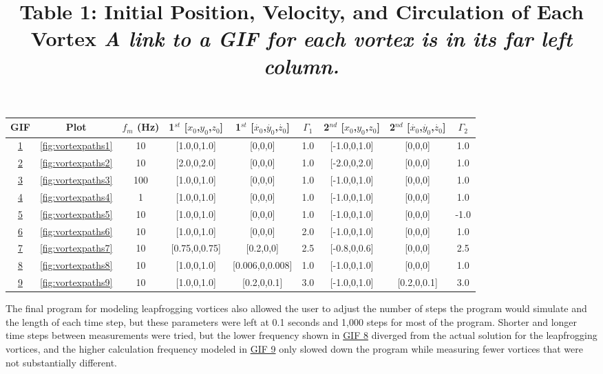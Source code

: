 \documentclass{article}
\begin{document}
\begin{table}
	\centering
	\title{Table 1: Initial Position, Velocity, and Circulation of Each Vortex \newline}
	\title{\emph{A link to a GIF for each vortex is in its far left column.}}
	\begin{tabular}{ | c | c | c | c | c | c | c | c | c |}
		\hline
		GIF & Plot & $f_m$ (Hz) & 1$^{st}$ [$x_0$,$y_0$,$z_0$] & 1$^{st}$ [$\dot{x_0}$,$\dot{y_0}$,$\dot{z_0}$] & $\Gamma_1$ & 2$^{nd}$ [$x_0$,$y_0$,$z_0$] & 2$^{nd}$ [$\dot{x_0}$,$\dot{y_0}$,$\dot{z_0}$] & $\Gamma_2$ \\ \hline
		\href{https://imgur.com/U4cND6X}{1} & \ref{fig:vortexpaths1} & 10 & [1.0,0,1.0] & [0,0,0] & 1.0 & [-1.0,0,1.0] & [0,0,0] & 1.0 \\ \hline
		\href{https://imgur.com/lviamWB}{2} & \ref{fig:vortexpaths2} & 10 & [2.0,0,2.0] & [0,0,0] & 1.0 & [-2.0,0,2.0] & [0,0,0] & 1.0 \\ \hline
		\href{https://imgur.com/6jT1mT0}{3} & \ref{fig:vortexpaths3} & 100 & [1.0,0,1.0] & [0,0,0] & 1.0 & [-1.0,0,1.0] & [0,0,0] & 1.0 \\ \hline
		\href{https://imgur.com/PtazOFB}{4} & \ref{fig:vortexpaths4} & 1 & [1.0,0,1.0] & [0,0,0] & 1.0 & [-1.0,0,1.0] & [0,0,0] & 1.0 \\ \hline	
		\href{https://imgur.com/wSpWEQV}{5} & \ref{fig:vortexpaths5} & 10 & [1.0,0,1.0] & [0,0,0] & 1.0 & [-1.0,0,1.0] & [0,0,0] & -1.0 \\ \hline
		\href{https://imgur.com/aZzMnJV}{6} & \ref{fig:vortexpaths6} & 10 & [1.0,0,1.0] & [0,0,0] & 2.0 & [-1.0,0,1.0] & [0,0,0] & 1.0 \\ \hline
		\href{https://imgur.com/nKVGuJ9}{7} & \ref{fig:vortexpaths7} & 10 & [0.75,0,0.75] & [0.2,0,0] & 2.5 & [-0.8,0,0.6] & [0,0,0] & 2.5 \\ \hline
		\href{https://imgur.com/UZyBsYO}{8} & \ref{fig:vortexpaths8} & 10 & [1.0,0,1.0] & [0.006,0,0.008] & 1.0 & [-1.0,0,1.0] & [0,0,0] & 1.0 \\ \hline
		\href{https://imgur.com/tctJPyS}{9} & \ref{fig:vortexpaths9} & 10 & [1.0,0,1.0] & [0.2,0,0.1] & 3.0 & [-1.0,0,1.0] & [0.2,0,0.1] & 3.0 \\ \hline
	\end{tabular}
\end{table}

The final program for modeling leapfrogging vortices also allowed the user to adjust the number of steps the program would simulate and the length of each time step, but these parameters were left at 0.1 seconds and 1,000 steps for most of the program. Shorter and longer time steps between measurements were tried, but the lower frequency shown in \href{https://imgur.com/PtazOFB}{GIF 8} diverged from the actual solution for the leapfrogging vortices, and the higher calculation frequency modeled in \href{https://imgur.com/6jT1mT0}{GIF 9} only slowed down the program while measuring fewer vortices that were not substantially different.
\end{document}
